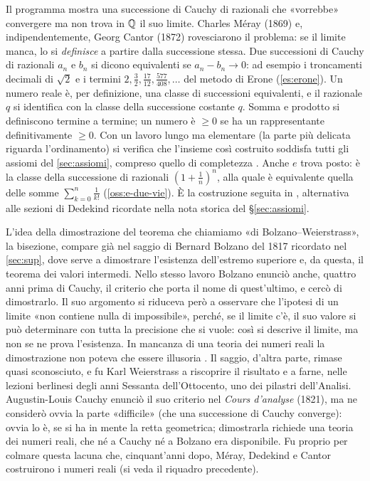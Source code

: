 \begin{idea}
Il programma mostra una successione di Cauchy di razionali che «vorrebbe» convergere ma
non trova in $\mathbb{Q}$ il suo limite. Charles Méray (1869) e, indipendentemente, Georg Cantor
(1872) rovesciarono il problema: se il limite manca, lo si \emph{definisce} a partire
dalla successione stessa. Due successioni di Cauchy di razionali $a_{n}$ e $b_{n}$ si
dicono equivalenti se $a_{n}-b_{n}\to0$: ad esempio i troncamenti decimali di $\sqrt2$ e
i termini $2,\frac32,\frac{17}{12},\frac{577}{408},\dots$ del metodo di Erone
(\cref{es:erone}). Un numero reale è, per definizione, una classe di successioni
equivalenti, e il razionale $q$ si identifica con la classe della successione costante
$q$. Somma e prodotto si definiscono termine a termine; un numero è $\ge0$ se ha un
rappresentante definitivamente $\ge0$. Con un lavoro lungo ma elementare (la parte più
delicata riguarda l'ordinamento) si verifica che l'insieme così costruito soddisfa tutti
gli assiomi del \cref{sec:assiomi}, compreso quello di completezza \cite{giusti}. Anche
$e$ trova posto: è la classe della successione di razionali $(1+\frac1n)^{n}$, alla
quale è equivalente quella delle somme $\sum_{k=0}^{n}\frac1{k!}$
(\cref{oss:e-due-vie}). È la costruzione seguita in \cite{tao1}, alternativa alle
sezioni di Dedekind ricordate nella nota storica del \S\ref{sec:assiomi}.
\end{idea}

\begin{notastorica}
L'idea della dimostrazione del teorema che chiamiamo «di Bolzano--Weierstrass», la
bisezione, compare già nel saggio di Bernard Bolzano del 1817 ricordato nel
\cref{sec:sup}, dove serve a dimostrare l'esistenza dell'estremo superiore e, da questa,
il teorema dei valori intermedi. Nello stesso lavoro Bolzano enunciò
anche, quattro anni prima di Cauchy, il criterio che porta il nome di quest'ultimo, e
cercò di dimostrarlo. Il suo argomento si riduceva però a osservare che l'ipotesi di un
limite «non contiene nulla di impossibile», perché, se il limite c'è, il suo valore si
può determinare con tutta la precisione che si vuole: così si descrive il limite, ma non
se ne prova l'esistenza. In mancanza di una teoria dei numeri reali la dimostrazione non
poteva che essere illusoria \cite{giusti}. Il saggio, d'altra parte, rimase quasi
sconosciuto, e fu Karl Weierstrass a riscoprire il risultato e a
farne, nelle lezioni berlinesi degli anni Sessanta dell'Ottocento, uno dei pilastri
dell'Analisi. Augustin-Louis Cauchy enunciò il suo criterio nel \emph{Cours d'analyse}
(1821), ma ne considerò ovvia la parte «difficile» (che una successione di Cauchy
converge): ovvia lo è, se si ha in mente la retta geometrica; dimostrarla richiede una
teoria dei numeri reali, che né a Cauchy né a Bolzano era disponibile. Fu proprio per
colmare questa lacuna che, cinquant'anni dopo, Méray, Dedekind e Cantor costruirono i
numeri reali (si veda il riquadro precedente).
\end{notastorica}

